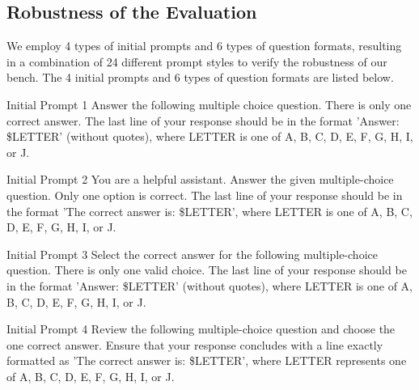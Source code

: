 \subsection{Robustness of the Evaluation}
\label{appendix:robustness}
We employ 4 types of initial prompts and 6 types of question formats, resulting in a
combination of 24 different prompt styles to verify the robustness of our bench. The 4 initial prompts and 6 types of question formats are listed below.

\begin{promptbox}{Initial Prompt 1}
Answer the following multiple choice question. There is only one correct answer. The last line of your response should be in the format 'Answer: \$LETTER' (without quotes), where LETTER is one of A, B, C, D, E, F, G, H, I, or J.
\end{promptbox}



\begin{promptbox}{Initial Prompt 2}
You are a helpful assistant. Answer the given multiple-choice question. Only one option is correct. The last line of your response should be in the format 'The correct answer is: \$LETTER', where LETTER is one of A, B, C, D, E, F, G, H, I, or J.

\end{promptbox}


\begin{promptbox}{Initial Prompt 3}
Select the correct answer for the following multiple-choice question. There is only one valid choice. The last line of your response should be in the format 'Answer: \$LETTER' (without quotes), where LETTER is one of A, B, C, D, E, F, G, H, I, or J.

\end{promptbox}


\begin{promptbox}{Initial Prompt 4}
Review the following multiple-choice question and choose the one correct answer. Ensure that your response concludes with a line exactly formatted as 'The correct answer is: \$LETTER', where LETTER represents one of A, B, C, D, E, F, G, H, I, or J.
\end{promptbox}


